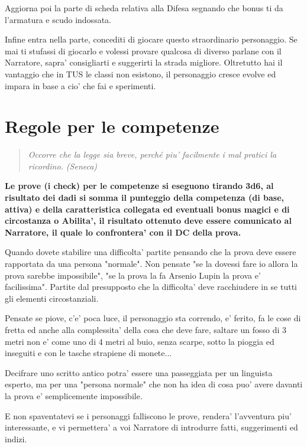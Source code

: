 \documentclass[a4paper,11pt,twoside,openany]{book}
\begin{document}
Aggiorna poi la parte di scheda relativa alla Difesa segnando che bonus ti da l'armatura e scudo indossata.

Infine entra nella parte, concediti di giocare questo straordinario personaggio. Se mai ti stufassi di giocarlo e volessi provare qualcosa di diverso parlane con il Narratore, sapra' consigliarti e suggerirti la strada migliore.
Oltretutto hai il vantaggio che in TUS le classi non esistono, il personaggio cresce evolve ed impara in base a cio' che fai e sperimenti.

\pagebreak

\section{Regole per le competenze}

\label{regole-per-le-competenze}
\begin{quote}\textit{
Occorre che la legge sia breve, perché piu' facilmente i mal pratici la ricordino. (Seneca)
}\end{quote}

\textbf{Le prove (i check) per le competenze si eseguono tirando 3d6, al risultato dei dadi si somma il punteggio della competenza (di base, attiva) e della caratteristica collegata ed eventuali bonus magici e di circostanza o Abilita', il risultato ottenuto deve essere comunicato al Narratore, il quale lo confrontera' con il DC della prova.}

Quando dovete stabilire una difficolta' partite pensando che la prova deve essere rapportata da una persona "normale". Non pensate "se la dovessi fare io allora la prova sarebbe impossibile", "se la prova la fa Arsenio Lupin la prova e' facilissima". Partite dal presupposto che la difficolta' deve racchiudere in se tutti gli elementi circostanziali.

Pensate se piove, c'e' poca luce, il personaggio sta correndo, e' ferito, fa le cose di fretta ed anche alla complessita' della cosa che deve fare, saltare un fosso di 3 metri non e' come uno di 4 metri al buio, senza scarpe, sotto la pioggia ed inseguiti e con le tasche strapiene di monete...

Decifrare uno scritto antico potra' essere una passeggiata per un linguista esperto, ma per una "persona normale" che non ha idea di cosa puo' avere davanti la prova e' semplicemente impossibile.

E non spaventatevi se i personaggi falliscono le prove, rendera' l'avventura piu' interessante, e vi permettera' a voi Narratore di introdurre fatti, suggerimenti ed indizi.
\end{document}
